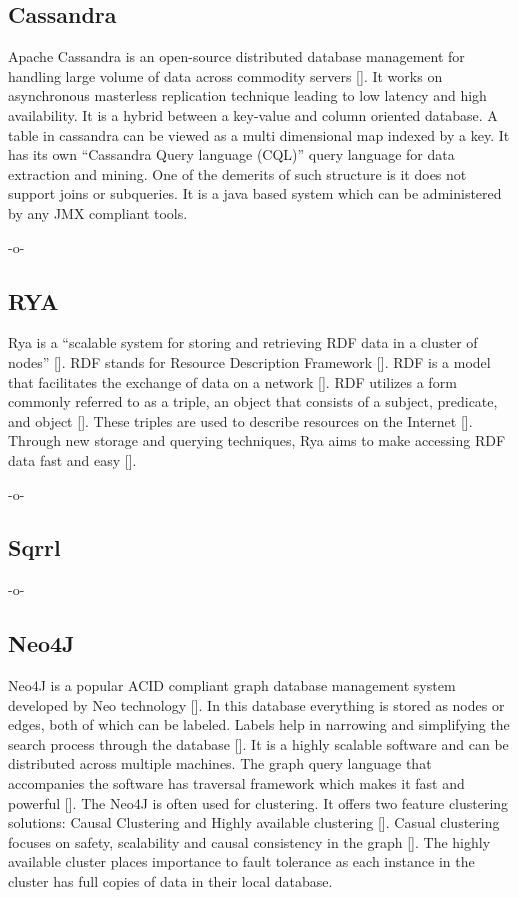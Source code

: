\subsection{Cassandra}

Apache Cassandra is an open-source distributed database management for
handling large volume of data across commodity
servers [\cite{www-cassandra}]. It works on asynchronous masterless
replication technique leading to low latency and high availability. It
is a hybrid between a key-value and column oriented database. A table
in cassandra can be viewed as a multi dimensional map indexed by a
key. It has its own ``Cassandra Query language (CQL)'' query language
for data extraction and mining. One of the demerits of such structure
is it does not support joins or subqueries. It is a java based system
which can be administered by any JMX compliant tools.

     -o-

\subsection{RYA}

Rya is a ``scalable system for storing and retrieving RDF data in a
cluster of nodes'' [\cite{Punnoose}]. RDF stands for Resource
Description Framework [\cite{Punnoose}]. RDF is a model that facilitates
the exchange of data on a network [\cite{w3}]. RDF utilizes a form
commonly referred to as a triple, an object that consists of a
subject, predicate, and object [\cite{Punnoose}].  These triples are
used to describe resources on the Internet [\cite{Punnoose}]. Through
new storage and querying techniques, Rya aims to make accessing RDF
data fast and easy [\cite{apacherya}].

     -o-
     
\subsection{Sqrrl}

-o- 

\subsection{Neo4J}

Neo4J is a popular ACID compliant graph database management system
developed by Neo technology [\cite{www-wiki-neo4j}].  In this database
everything is stored as nodes or edges, both of which can be
labeled. Labels help in narrowing and simplifying the search process
through the database [\cite{www-slideshare}]. It is a highly scalable
software and can be distributed across multiple machines.  The graph
query language that accompanies the software has traversal framework
which makes it fast and powerful [\cite{www-neo4j}]. The Neo4J is often
used for clustering. It offers two feature clustering solutions:
Causal Clustering and Highly available
clustering [\cite{www-neo4j-causal-cluster}]. Casual clustering focuses
on safety, scalability and causal consistency in the
graph [\cite{www-neo4j-HA-cluster}]. The highly available cluster places
importance to fault tolerance as each instance in the cluster has full
copies of data in their local database.

